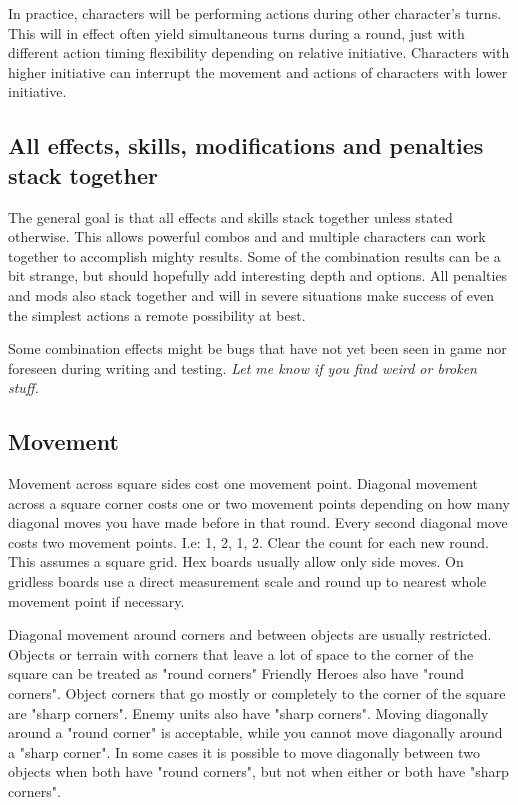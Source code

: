 In practice, characters will be performing actions during other character's turns. This will in effect often yield simultaneous turns during a round, just with different action timing flexibility depending on relative initiative. Characters with higher initiative can interrupt the movement and actions of characters with lower initiative.


\subsection*{All effects, skills, modifications and penalties stack together}
The general goal is that all effects and skills stack together unless stated otherwise. This allows powerful combos and and multiple characters can work together to accomplish mighty results. Some of the combination results can be a bit strange, but should hopefully add interesting depth and options.
All penalties and mods also stack together and will in severe situations make success of even the simplest actions a remote possibility at best.

Some combination effects might be bugs that have not yet been seen in game nor foreseen during writing and testing. \emph{Let me know if you find weird or broken stuff.}


\subsection*{Movement}
Movement across square sides cost one movement point. Diagonal movement across a square corner costs one or two movement points depending on how many diagonal moves you have made before in that round. Every second diagonal move costs two movement points. I.e: 1, 2, 1, 2. Clear the count for each new round.
This assumes a square grid. Hex boards usually allow only side moves. On gridless boards use a direct measurement scale and round up to nearest whole movement point if necessary.

Diagonal movement around corners and between objects are usually restricted.
Objects or terrain with corners that leave a lot of space to the corner of the square can be treated as "round corners" Friendly Heroes also have "round corners".
Object corners that go mostly or completely to the corner of the square are "sharp corners". Enemy units also have "sharp corners".
Moving diagonally around a "round corner" is acceptable, while you cannot move diagonally around a "sharp corner". In some cases it is possible to move diagonally between two objects when both have "round corners", but not when either or both have "sharp corners".

